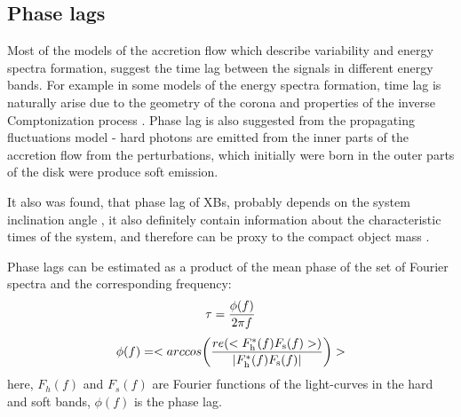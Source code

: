 \documentclass[a4paper,fleqn,usenatbib]{mnras}
\begin{document}


\subsection{Phase lags}
    Most of the models of the accretion flow which describe variability and energy spectra formation, suggest the time lag between the signals in different energy bands. 
For example in some models of the energy spectra formation, time lag is naturally arise due to the geometry of the corona and properties of the inverse Comptonization process \citep[see, e.g.][]{kotov01}.
Phase lag is also suggested from the propagating fluctuations model - hard photons are emitted from the inner parts of the accretion flow from the perturbations, which initially were born in the outer parts of the disk were produce soft emission.  

It also was found, that phase lag of XBs, probably depends on the system inclination angle \citep{eijeden17}, it also definitely contain information about the characteristic times of the system, and therefore can be proxy to the compact object mass \citep{}. 

Phase lags can be estimated as a product of the mean phase of the set of Fourier spectra and the corresponding frequency:
\begin{equation}
                \tau = \frac{\phi(f)}{2\pi f}\\
\end{equation}
\begin{equation}
        \phi(f) = <arccos{\left(\frac{re(<F_{\rm h}^{*}(f)F_{\rm s}(f)>)}{|F_{\rm h}^{*}(f) F_{\rm s}(f)|}\right)}>
        \label{eq:phase_lag}
\end{equation}
here, $F_h(f)$ and $F_s(f)$ are Fourier functions of the light-curves in the hard and soft bands, $\phi(f)$ is the phase lag. 
\end{document}
